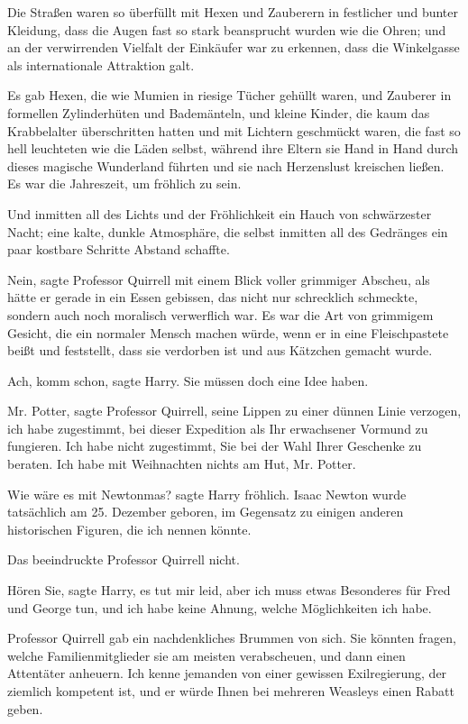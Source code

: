 Die Straßen waren so überfüllt mit Hexen und Zauberern in festlicher und bunter
Kleidung, dass die Augen fast so stark beansprucht wurden wie die Ohren; und an
der verwirrenden Vielfalt der Einkäufer war zu erkennen, dass die Winkelgasse
als internationale Attraktion galt.

Es gab Hexen, die wie Mumien in riesige Tücher gehüllt waren, und Zauberer in
formellen Zylinderhüten und Bademänteln, und kleine Kinder, die kaum das
Krabbelalter überschritten hatten und mit Lichtern geschmückt waren, die fast so
hell leuchteten wie die Läden selbst, während ihre Eltern sie Hand in Hand durch
dieses magische Wunderland führten und sie nach Herzenslust kreischen ließen. Es
war die Jahreszeit, um fröhlich zu sein.

Und inmitten all des Lichts und der Fröhlichkeit ein Hauch von schwärzester
Nacht; eine kalte, dunkle Atmosphäre, die selbst inmitten all des Gedränges ein
paar kostbare Schritte Abstand schaffte.

\glqq{}Nein\grqq{}, sagte Professor Quirrell mit einem Blick voller grimmiger
Abscheu, als hätte er gerade in ein Essen gebissen, das nicht nur schrecklich
schmeckte, sondern auch noch moralisch verwerflich war. Es war die Art von
grimmigem Gesicht, die ein normaler Mensch machen würde, wenn er in eine
Fleischpastete beißt und feststellt, dass sie verdorben ist und aus Kätzchen
gemacht wurde.

\glqq{}Ach, komm schon\grqq{}, sagte Harry. \glqq{}Sie müssen doch eine Idee
haben.\grqq{}

\glqq{}Mr. Potter\grqq{}, sagte Professor Quirrell, seine Lippen zu einer dünnen
Linie verzogen, \glqq{}ich habe zugestimmt, bei dieser Expedition als Ihr
erwachsener Vormund zu fungieren. Ich habe nicht zugestimmt, Sie bei der Wahl
Ihrer Geschenke zu beraten. Ich habe mit Weihnachten nichts am Hut, Mr. Potter.\grqq{}

\glqq{}Wie wäre es mit Newtonmas?\grqq{} sagte Harry fröhlich. \glqq{}Isaac Newton
wurde tatsächlich am 25. Dezember geboren, im Gegensatz zu einigen anderen
historischen Figuren, die ich nennen könnte.\grqq{}

Das beeindruckte Professor Quirrell nicht.

\glqq{}Hören Sie\grqq{}, sagte Harry, \glqq{}es tut mir leid, aber ich muss etwas
Besonderes für Fred und George tun, und ich habe keine Ahnung, welche
Möglichkeiten ich habe.\grqq{}

Professor Quirrell gab ein nachdenkliches Brummen von sich. \glqq{}Sie könnten
fragen, welche Familienmitglieder sie am meisten verabscheuen, und dann einen
Attentäter anheuern. Ich kenne jemanden von einer gewissen Exilregierung, der
ziemlich kompetent ist, und er würde Ihnen bei mehreren Weasleys einen Rabatt
geben.\grqq{}

